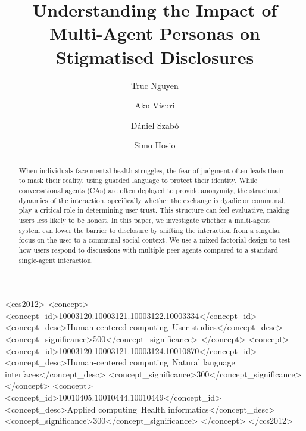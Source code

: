 \documentclass[sigconf]{acmart}
\begin{document}
\title{Understanding the Impact of Multi-Agent Personas on Stigmatised Disclosures}

\author{Truc Nguyen}

\author{Aku Visuri}

\author{Dániel Szabó}

\author{Simo Hosio}




\renewcommand{\shortauthors}{Nguyen, et al.}

\begin{abstract}
When individuals face mental health struggles, the fear of judgment often leads them to mask their reality, using guarded language to protect their identity. While conversational agents (CAs) are often deployed to provide anonymity, the structural dynamics of the interaction, specifically whether the exchange is dyadic or communal, play a critical role in determining user trust. This structure can feel evaluative, making users less likely to be honest. In this paper, we investigate whether a multi-agent system can lower the barrier to disclosure by shifting the interaction from a singular focus on the user to a communal social context. We use a mixed-factorial design to test how users respond to discussions with multiple peer agents compared to a standard single-agent interaction.

\end{abstract}

\begin{CCSXML}
<ccs2012>
   <concept>
 <concept_id>10003120.10003121.10003122.10003334</concept_id>
       <concept_desc>Human-centered computing~User studies</concept_desc>
       <concept_significance>500</concept_significance>
       </concept>
   <concept>
       <concept_id>10003120.10003121.10003124.10010870</concept_id>
       <concept_desc>Human-centered computing~Natural language interfaces</concept_desc>
       <concept_significance>300</concept_significance>
       </concept>
   <concept>
       <concept_id>10010405.10010444.10010449</concept_id>
       <concept_desc>Applied computing~Health informatics</concept_desc>
       <concept_significance>300</concept_significance>
       </concept>
 </ccs2012>
\end{CCSXML}
\end{document}
